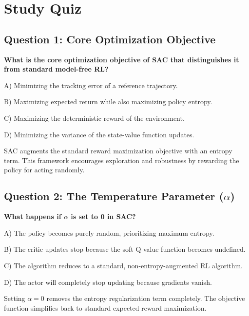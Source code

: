 \documentclass[12pt,a4paper]{article}
\theoremstyle{noteplain}
\theoremstyle{noteexercise}
\begin{document}
\section{Study Quiz}\label{sec:quiz}



\subsection{Question 1: Core Optimization Objective}\label{ssec:q1}



\textbf{What is the core optimization objective of SAC that distinguishes it from standard model-free RL?}

A) Minimizing the tracking error of a reference trajectory.

B) Maximizing expected return while also maximizing policy entropy.

C) Maximizing the deterministic reward of the environment.

D) Minimizing the variance of the state-value function updates.

\begin{keypoint}[Answer: B]

SAC augments the standard reward maximization objective with an entropy term. This framework encourages exploration and robustness by rewarding the policy for acting randomly.

\end{keypoint}



\subsection{Question 2: The Temperature Parameter ($\alpha$)}\label{ssec:q2}



\textbf{What happens if $\alpha$ is set to 0 in SAC?}

A) The policy becomes purely random, prioritizing maximum entropy.

B) The critic updates stop because the soft Q-value function becomes undefined.

C) The algorithm reduces to a standard, non-entropy-augmented RL algorithm.

D) The actor will completely stop updating because gradients vanish.

\begin{keypoint}[Answer: C]

Setting $\alpha = 0$ removes the entropy regularization term completely. The objective function simplifies back to standard expected reward maximization.

\end{keypoint}
\end{document}
